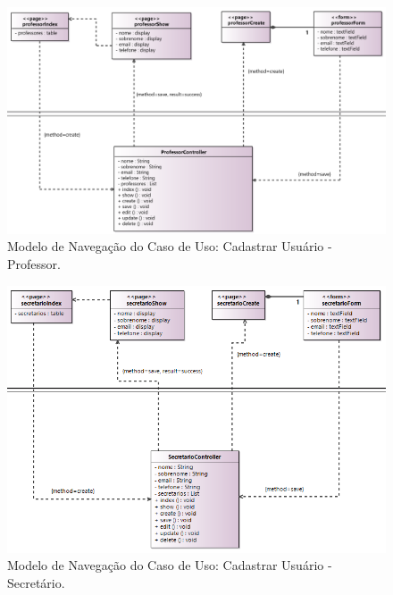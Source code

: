 \begin{figure}[h]
	\centering
	\includegraphics[width=1\textwidth]{figuras/figura-arquitetura-cadastrarUsuarioProfessor.png}
	\caption{Modelo de Navegação do Caso de Uso: Cadastrar Usuário - Professor.}
	\label{figura-arquitetura-cadastrarUsuarioProfessor}
\end{figure}

\begin{figure}[h]
	\centering
	\includegraphics[width=1\textwidth]{figuras/figura-arquitetura-cadastrarUsuarioSecretario.png}
	\caption{Modelo de Navegação do Caso de Uso: Cadastrar Usuário - Secretário.}
	\label{figura-arquitetura-cadastrarUsuarioSecretario}
\end{figure}

